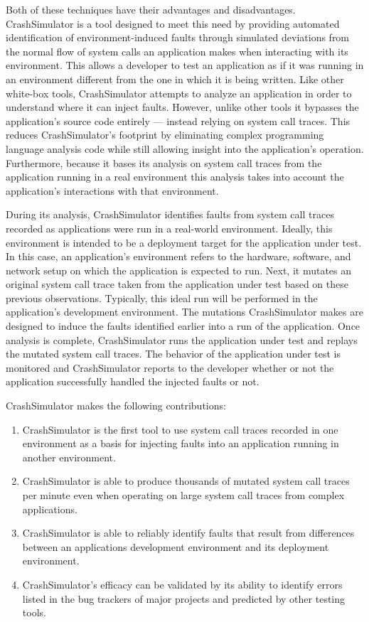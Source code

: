    Both of these techniques have their advantages and disadvantages. CrashSimulator is a tool designed to meet this
    need by providing automated identification of environment-induced faults through simulated deviations from the
    normal flow of system calls an application makes when interacting with its environment. This allows a developer to
    test an application as if it was running in an environment different from the one in which it is being written. Like
    other white-box tools, CrashSimulator attempts to analyze an application in order to understand where it can inject
    faults.  However, unlike other tools it bypasses the application's source code entirely --- instead relying on
    system call traces.  This reduces CrashSimulator's footprint by eliminating complex programming language analysis
    code while still allowing insight into the application's operation. Furthermore, because it bases its analysis on
    system call traces from the application running in a real environment this analysis takes into account the
    application's interactions with that environment.

    During its analysis, CrashSimulator identifies faults from system call traces recorded as applications were run in a
    real-world environment. Ideally, this environment is intended to be a deployment target for the application under
    test. In this case, an application's environment refers to the hardware, software, and network setup on which the
    application is expected to run. Next, it mutates an original system call trace taken from the application under test
    based on these previous observations. Typically, this ideal run will be performed in the application's development
    environment. The mutations CrashSimulator makes are designed to induce the faults identified earlier into a run of
    the application.  Once analysis is complete, CrashSimulator runs the application under test and replays the mutated
    system call traces. The behavior of the application under test is monitored and CrashSimulator reports to the
    developer whether or not the application successfully handled the injected faults or not.

    CrashSimulator makes the following contributions:

    \begin{enumerate}
        \item{CrashSimulator is the first tool to use system call traces recorded in one environment as a basis for
            injecting faults into an application running in another environment.}
        \item{CrashSimulator is able to produce thousands of mutated system call traces per minute even when operating
            on large system call traces from complex applications.}
        \item{CrashSimulator is able to reliably identify faults that result from differences between an applications
            development environment and its deployment environment.}
        \item{CrashSimulator's efficacy can be validated by its ability to identify errors listed in the bug trackers of
            major projects and predicted by other testing tools.}
    \end{enumerate}
